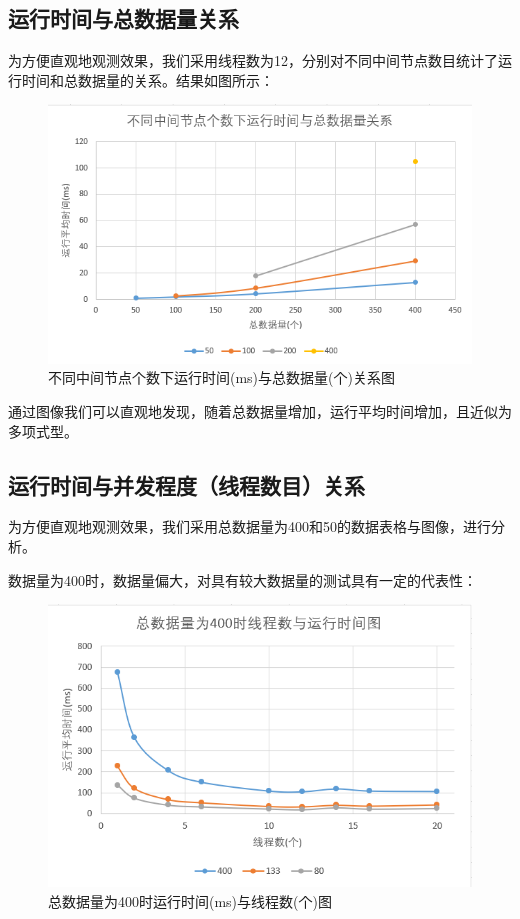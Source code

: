 \documentclass[UTF8]{ctexart}
\begin{document}
\subsection{运行时间与总数据量关系}
为方便直观地观测效果，我们采用线程数为12，分别对不同中间节点数目统计了运行时间和总数据量的关系。结果如图所示：
\begin{figure}[H]
    \centering
    \includegraphics[scale=0.7]{T-totN.png}
    \caption{不同中间节点个数下运行时间(ms)与总数据量(个)关系图}
\end{figure}

通过图像我们可以直观地发现，随着总数据量增加，运行平均时间增加，且近似为多项式型。

\subsection{运行时间与并发程度（线程数目）关系}
为方便直观地观测效果，我们采用总数据量为400和50的数据表格与图像，进行分析。

数据量为400时，数据量偏大，对具有较大数据量的测试具有一定的代表性：

\begin{figure}[H]
    \centering
    \includegraphics[scale=0.7]{400.png}
    \caption{总数据量为400时运行时间(ms)与线程数(个)图}
\end{figure}
\end{document}
